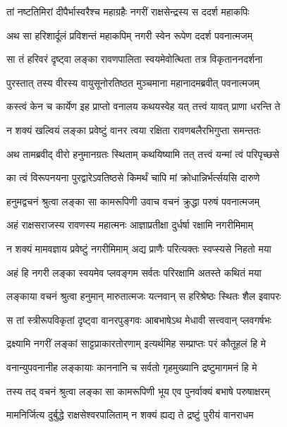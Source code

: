 \twolineshloka
{तां नष्टतिमिरां दीपैर्भास्वरैश्च महाग्रहैः}
{नगरीं राक्षसेन्द्रस्य स ददर्श महाकपिः} %

\twolineshloka
{अथ सा हरिशार्दूलं प्रविशन्तं महाकपिम्}
{नगरी स्वेन रूपेण ददर्श पवनात्मजम्} %

\twolineshloka
{सा तं हरिवरं दृष्ट्वा लङ्का रावणपालिता}
{स्वयमेवोत्थिता तत्र विकृताननदर्शना} %

\twolineshloka
{पुरस्तात् तस्य वीरस्य वायुसूनोरतिष्ठत}
{मुञ्चमाना महानादमब्रवीत् पवनात्मजम्} %

\twolineshloka
{कस्त्वं केन च कार्येण इह प्राप्तो वनालय}
{कथयस्वेह यत् तत्त्वं यावत् प्राणा धरन्ति ते} %

\twolineshloka
{न शक्यं खल्वियं लङ्का प्रवेष्टुं वानर त्वया}
{रक्षिता रावणबलैरभिगुप्ता समन्ततः} %

\twolineshloka
{अथ तामब्रवीद् वीरो हनुमानग्रतः स्थिताम्}
{कथयिष्यामि तत् तत्त्वं यन्मां त्वं परिपृच्छसे} %

\twolineshloka
{का त्वं विरूपनयना पुरद्वारेऽवतिष्ठसे}
{किमर्थं चापि मां क्रोधान्निर्भर्त्सयसि दारुणे} %

\twolineshloka
{हनुमद्वचनं श्रुत्वा लङ्का सा कामरूपिणी}
{उवाच वचनं क्रुद्धा परुषं पवनात्मजम्} %

\twolineshloka
{अहं राक्षसराजस्य रावणस्य महात्मनः}
{आज्ञाप्रतीक्षा दुर्धर्षा रक्षामि नगरीमिमाम्} %

\twolineshloka
{न शक्यं मामवज्ञाय प्रवेष्टुं नगरीमिमाम्}
{अद्य प्राणैः परित्यक्तः स्वप्स्यसे निहतो मया} %

\twolineshloka
{अहं हि नगरी लङ्का स्वयमेव प्लवङ्गम}
{सर्वतः परिरक्षामि अतस्ते कथितं मया} %

\twolineshloka
{लङ्काया वचनं श्रुत्वा हनुमान् मारुतात्मजः}
{यत्नवान् स हरिश्रेष्ठः स्थितः शैल इवापरः} %

\twolineshloka
{स तां स्त्रीरूपविकृतां दृष्ट्वा वानरपुङ्गवः}
{आबभाषेऽथ मेधावी सत्त्ववान् प्लवगर्षभः} %

\twolineshloka
{द्रक्ष्यामि नगरीं लङ्कां साट्टप्राकारतोरणाम्}
{इत्यर्थमिह सम्प्राप्तः परं कौतूहलं हि मे} %

\twolineshloka
{वनान्युपवनानीह लङ्कायाः काननानि च}
{सर्वतो गृहमुख्यानि द्रष्टुमागमनं हि मे} %

\twolineshloka
{तस्य तद् वचनं श्रुत्वा लङ्का सा कामरूपिणी}
{भूय एव पुनर्वाक्यं बभाषे परुषाक्षरम्} %

\twolineshloka
{मामनिर्जित्य दुर्बुद्धे राक्षसेश्वरपालिताम्}
{न शक्यं ह्यद्य ते द्रष्टुं पुरीयं वानराधम} %


